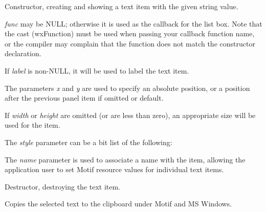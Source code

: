 Constructor, creating and showing a text item with the given string
value. 

{\it func} may be NULL; otherwise it is used as the callback for the
list box.  Note that the cast (wxFunction) must be used when passing
your callback function name, or the compiler may complain that the
function does not match the constructor declaration.

If {\it label} is non-NULL, it will be used to label the text item.

The parameters {\it x} and {\it y} are used to specify an absolute
position, or a position after the previous panel item if omitted or
default.

If {\it width} or {\it height} are omitted (or are less than zero), an
appropriate size will be used for the item.

The {\it style} parameter can be a bit list of the following:

\begin{twocollist}\itemsep=0pt
\end{twocollist}

The {\it name} parameter is used to associate a name with the item,
allowing the application user to set Motif resource values for
individual text items.



Destructor, destroying the text item.



Copies the selected text to the clipboard under Motif and MS Windows.



